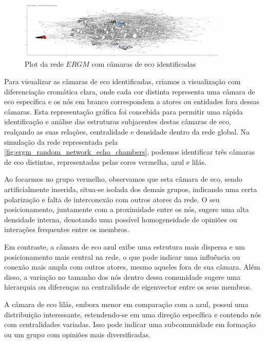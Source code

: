 \begin{figure}[!htb]
	\caption{Plot da rede $ERGM$ com câmaras de eco identificadas}
	\label{fig:ergm_random_network_echo_chambers}
	\centering
	\includegraphics[width=0.9\textwidth]{images/ergm_random_network_echo_chambers.png}
	\fautor
\end{figure}

Para visualizar as câmaras de eco identificadas, criamos a visualização com diferenciação cromática clara, onde cada cor distinta representa uma câmara de eco específica e os nós em branco correspondem a atores ou entidades fora dessas câmaras. Esta representação gráfica foi concebida para permitir uma rápida identificação e análise das estruturas subjacentes destas câmaras de eco, realçando as suas relações, centralidade e densidade dentro da rede global. Na simulação da rede representada pela \autoref{fig:ergm_random_network_echo_chambers}, podemos identificar três câmaras de eco distintas, representadas pelas cores vermelha, azul e lilás.

Ao focarmos no grupo vermelho, observamos que esta câmara de eco, sendo artificialmente inserida, situa-se isolada dos demais grupos, indicando uma certa polarização e falta de interconexão com outros atores da rede. O seu posicionamento, juntamente com a proximidade entre os nós, sugere uma alta densidade interna, denotando uma possível homogeneidade de opiniões ou interações frequentes entre os membros.

Em contraste, a câmara de eco azul exibe uma estrutura mais dispersa e um posicionamento mais central na rede, o que pode indicar uma influência ou conexão mais ampla com outros atores, mesmo aqueles fora de sua câmara. Além disso, a variação no tamanho dos nós dentro dessa comunidade sugere uma hierarquia ou diferenças na centralidade de eigenvector entre os seus membros.

A câmara de eco lilás, embora menor em comparação com a azul, possui uma distribuição interessante, estendendo-se em uma direção específica e contendo nós com centralidades variadas. Isso pode indicar uma subcomunidade em formação ou um grupo com opiniões mais diversificadas.

